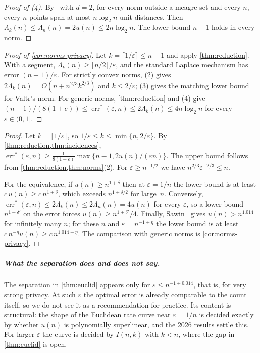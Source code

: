 \documentclass[anonymous,a4paper,USenglish,cleveref,autoref,thm-restate]{socg-lipics-v2021}
\newcommand{\eps}{\varepsilon}
\newcommand{\Lam}{\Lambda}
\newcommand{\errs}{\operatorname{err}^*}
\begin{document}
\begin{proof}[Proof of (4)]
By~\cite{ABS23} with $d=2$, for every norm outside a meagre set and every $n$, every $n$ points span at most $n\log_2 n$ unit distances. Then $\Lam_k(n)\le\Lam_n(n)=2u(n)\le2n\log_2 n$. The lower bound $n-1$ holds in every norm.
\end{proof}

\begin{proof}[Proof of \cref{cor:norms-privacy}]
Let $k=\lceil1/\eps\rceil\le n-1$ and apply \cref{thm:reduction}. With a segment, $\Lam_k(n)\ge\lfloor n/2\rfloor/\eps$, and the standard Laplace mechanism has error $(n-1)/\eps$. For strictly convex norms, (2) gives $2\Lam_k(n)=O(n+n^{2/3}k^{2/3})$ and $k\le 2/\eps$; (3) gives the matching lower bound for Valtr's norm. For generic norms, \cref{thm:reduction} and (4) give $(n-1)/(8(1+e))\le\errs(\eps,n)\le2\Lam_k(n)\le4n\log_2n$ for every $\eps\in(0,1]$.
\end{proof}

\euclid*

\begin{proof}
Let $k=\lceil1/\eps\rceil$, so $1/\eps\le k\le\min\{n,2/\eps\}$. By \cref{thm:reduction,thm:incidences}, $\errs(\eps,n)\ge\frac{1}{8(1+e)}\max\{n-1,2u(n)/(\eps n)\}$. The upper bound follows from \cref{thm:reduction,thm:norms}(2). For $\eps\ge n^{-1/2}$ we have $n^{2/3}\eps^{-2/3}\le n$.

For the equivalence, if $u(n)\ge n^{1+\delta}$ then at $\eps=1/n$ the lower bound is at least $c\,u(n)\ge c\,n^{1+\delta}$, which exceeds $n^{1+\delta/2}$ for large~$n$. Conversely, $\errs(\eps,n)\le2\Lam_k(n)\le2\Lam_n(n)=4u(n)$ for every $\eps$, so a lower bound $n^{1+\delta'}$ on the error forces $u(n)\ge n^{1+\delta'}/4$. Finally, Sawin~\cite{Sawin2026} gives $u(n)>n^{1.014}$ for infinitely many $n$; for these $n$ and $\eps=n^{-1+\eta}$ the lower bound is at least $c\,n^{-\eta}u(n)\ge c\,n^{1.014-\eta}$. The comparison with generic norms is \cref{cor:norms-privacy}.
\end{proof}

\subparagraph*{What the separation does and does not say.}
The separation in \cref{thm:euclid} appears only for $\eps\le n^{-1+0.014}$, that is, for very strong privacy. At such $\eps$ the optimal error is already comparable to the count itself, so we do not see it as a recommendation for practice. Its content is structural: the shape of the Euclidean rate curve near $\eps=1/n$ is decided exactly by whether $u(n)$ is polynomially superlinear, and the 2026 results settle this. For larger $\eps$ the curve is decided by $I(n,k)$ with $k<n$, where the gap in \cref{thm:euclid} is open.
\end{document}
